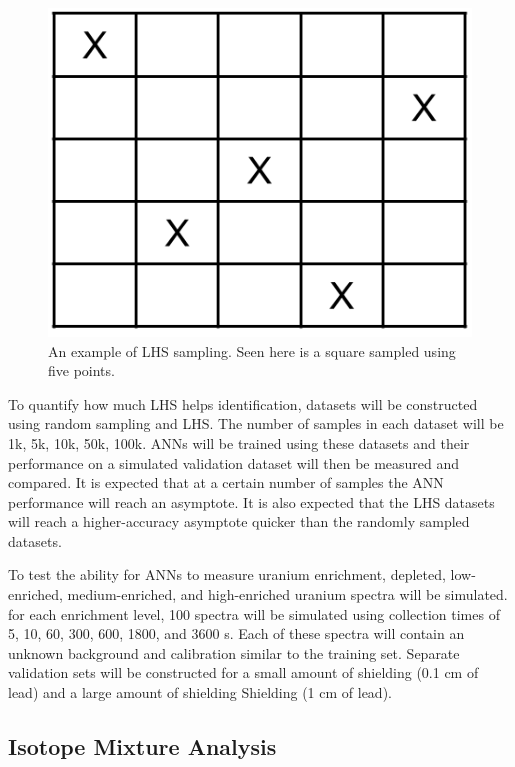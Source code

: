 \documentclass[tocnosub,noragright,centerchapter,12pt,fullpage]{uiucecethesis09}
\begin{document}
\begin{figure}[H]
\centering
\includegraphics[width=0.4\linewidth]{images/LHS_example}
\caption{An example of LHS sampling. Seen here is a square sampled using five points.}
\label{fig:LHS_example}
\end{figure}

To quantify how much LHS helps identification, datasets will be constructed using random sampling and LHS. The number of samples in each dataset will be 1k, 5k, 10k, 50k, 100k. ANNs will be trained using these datasets and their  performance on a simulated validation dataset will then be measured and compared. It is expected that at a certain number of samples the ANN performance will reach an asymptote. It is also expected that the LHS datasets will reach a higher-accuracy asymptote quicker than the randomly sampled datasets. 


To test the ability for ANNs to measure uranium enrichment, depleted, low-enriched, medium-enriched, and high-enriched uranium spectra will be simulated. for each enrichment level, 100 spectra will be simulated using collection times of 5, 10, 60, 300, 600, 1800, and 3600 s. Each of these spectra will contain an unknown background and calibration similar to the training set. Separate validation sets will be constructed for a small amount of shielding (0.1 cm of lead) and a large amount of shielding Shielding (1 cm of lead). 





\iffalse
\subsection{Isotope Mixture Analysis}

\end{document}
